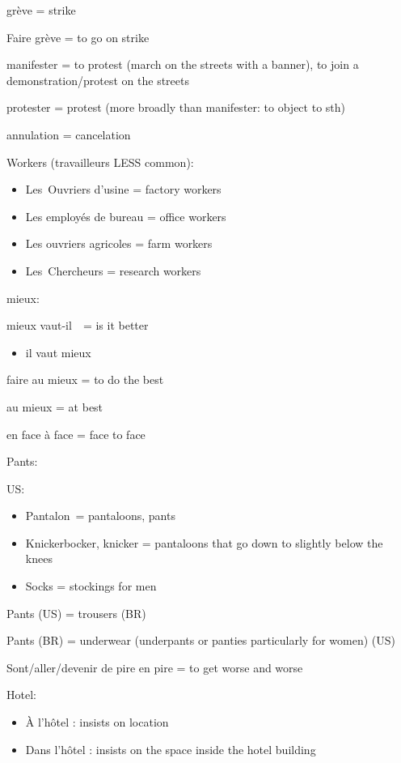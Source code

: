 grève = strike

Faire grève = to go on strike~

manifester = to protest (march on the streets with a banner), to join a
demonstration/protest on the streets

protester = protest (more broadly than manifester: to object to sth)

annulation = cancelation

Workers (travailleurs LESS common):

\begin{itemize}
\item
  Les~Ouvriers d'usine = factory workers~
\item
  Les employés de bureau = office workers~
\item
  Les ouvriers agricoles = farm workers~
\item
  Les~Chercheurs = research workers~
\end{itemize}

mieux:

mieux vaut-il~~= is it better

\begin{itemize}
\item
  il vaut mieux
\end{itemize}

faire au mieux = to do the best

au mieux = at best

en face à face = face to face

Pants:~

US:

\begin{itemize}
\item
  Pantalon~= pantaloons, pants
\item
  Knickerbocker, knicker = pantaloons that go down to slightly below the
  knees~
\item
  Socks = stockings for men
\end{itemize}

Pants (US) = trousers (BR)

Pants (BR) = underwear (underpants or panties particularly for women)
(US)

\hfill\break

Sont/aller/devenir de pire en pire = to get worse and worse~

Hotel:

\begin{itemize}
\item
  À l'hôtel : insists on location
\item
  Dans l'hôtel : insists on the space inside the hotel building
\end{itemize}

